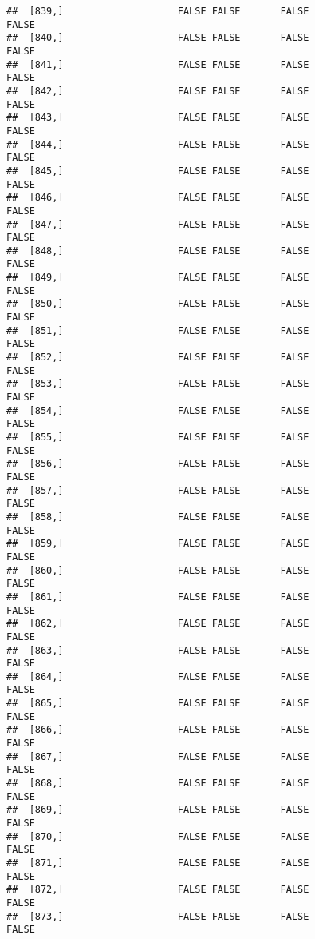 \documentclass[
]{article}
\begin{document}
\begin{verbatim}
##  [839,]                    FALSE FALSE       FALSE                FALSE
##  [840,]                    FALSE FALSE       FALSE                FALSE
##  [841,]                    FALSE FALSE       FALSE                FALSE
##  [842,]                    FALSE FALSE       FALSE                FALSE
##  [843,]                    FALSE FALSE       FALSE                FALSE
##  [844,]                    FALSE FALSE       FALSE                FALSE
##  [845,]                    FALSE FALSE       FALSE                FALSE
##  [846,]                    FALSE FALSE       FALSE                FALSE
##  [847,]                    FALSE FALSE       FALSE                FALSE
##  [848,]                    FALSE FALSE       FALSE                FALSE
##  [849,]                    FALSE FALSE       FALSE                FALSE
##  [850,]                    FALSE FALSE       FALSE                FALSE
##  [851,]                    FALSE FALSE       FALSE                FALSE
##  [852,]                    FALSE FALSE       FALSE                FALSE
##  [853,]                    FALSE FALSE       FALSE                FALSE
##  [854,]                    FALSE FALSE       FALSE                FALSE
##  [855,]                    FALSE FALSE       FALSE                FALSE
##  [856,]                    FALSE FALSE       FALSE                FALSE
##  [857,]                    FALSE FALSE       FALSE                FALSE
##  [858,]                    FALSE FALSE       FALSE                FALSE
##  [859,]                    FALSE FALSE       FALSE                FALSE
##  [860,]                    FALSE FALSE       FALSE                FALSE
##  [861,]                    FALSE FALSE       FALSE                FALSE
##  [862,]                    FALSE FALSE       FALSE                FALSE
##  [863,]                    FALSE FALSE       FALSE                FALSE
##  [864,]                    FALSE FALSE       FALSE                FALSE
##  [865,]                    FALSE FALSE       FALSE                FALSE
##  [866,]                    FALSE FALSE       FALSE                FALSE
##  [867,]                    FALSE FALSE       FALSE                FALSE
##  [868,]                    FALSE FALSE       FALSE                FALSE
##  [869,]                    FALSE FALSE       FALSE                FALSE
##  [870,]                    FALSE FALSE       FALSE                FALSE
##  [871,]                    FALSE FALSE       FALSE                FALSE
##  [872,]                    FALSE FALSE       FALSE                FALSE
##  [873,]                    FALSE FALSE       FALSE                FALSE

\end{verbatim}
\end{document}
